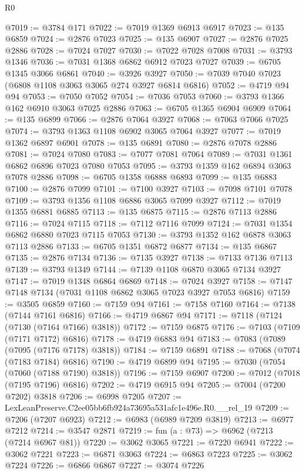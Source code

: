 \begin{lexlean}{R0}
\begin{coremodule}
@7019 := @3784 @171
@7022 := @7019 @1369 @6913 @6917
@7023 := @135 @6859
@7024 := @2876 @7023
@7025 := @135 @6907
@7027 := @2876 @7025 @2886
@7028 := @7024 @7027
@7030 := @7022 @7028 @7008
@7031 := @3793 @1346
@7036 := @7031 @1368 @6862 @6912 @7023 @7027
@7039 := @6705 @1345 @3066 @6861
@7040 := @3926 @3927
@7050 := @7039 @7040 @7023 (@6808 @1108 @3063 @3065 @274 @3927 @6814 @6816)
@7052 := @4719 @94 @94
@7053 := @7050 @7052
@7054 := @7036 @7053
@7060 := @3793 @1366 @162 @6910 @3063 @7025 @2886
@7063 := @6705 @1365 @6904 @6909
@7064 := @135 @6899
@7066 := @2876 @7064 @3927
@7068 := @7063 @7066 @7025
@7074 := @3793 @1363 @1108 @6902 @3065 @7064 @3927
@7077 := @7019 @1362 @6897 @6901
@7078 := @135 @6891
@7080 := @2876 @7078 @2886
@7081 := @7024 @7080
@7083 := @7077 @7081 @7064
@7089 := @7031 @1361 @6862 @6896 @7023 @7080 @7053
@7095 := @3793 @1359 @162 @6894 @3063 @7078 @2886
@7098 := @6705 @1358 @6888 @6893
@7099 := @135 @6883
@7100 := @2876 @7099
@7101 := @7100 @3927
@7103 := @7098 @7101 @7078
@7109 := @3793 @1356 @1108 @6886 @3065 @7099 @3927
@7112 := @7019 @1355 @6881 @6885
@7113 := @135 @6875
@7115 := @2876 @7113 @2886
@7116 := @7024 @7115
@7118 := @7112 @7116 @7099
@7124 := @7031 @1354 @6862 @6880 @7023 @7115 @7053
@7130 := @3793 @1352 @162 @6878 @3063 @7113 @2886
@7133 := @6705 @1351 @6872 @6877
@7134 := @135 @6867
@7135 := @2876 @7134
@7136 := @7135 @3927
@7138 := @7133 @7136 @7113
@7139 := @3793 @1349
@7144 := @7139 @1108 @6870 @3065 @7134 @3927
@7147 := @7019 @1348 @6864 @6869
@7148 := @7024 @3927
@7158 := @7147 @7148 @7134 (@7031 @1108 @6862 @3065 @7023 @3927 @7053 @6816)
@7159 := @3505 @6859
@7160 := @7159 @94
@7161 := @7158 @7160
@7164 := @7138 (@7144 @7161 @6816)
@7166 := @4719 @6867 @94
@7171 := @7118 (@7124 (@7130 (@7164 @7166) @3818))
@7172 := @7159 @6875
@7176 := @7103 (@7109 (@7171 @7172) @6816)
@7178 := @4719 @6883 @94
@7183 := @7083 (@7089 (@7095 (@7176 @7178) @3818))
@7184 := @7159 @6891
@7188 := @7068 (@7074 (@7183 @7184) @6816)
@7190 := @4719 @6899 @94
@7195 := @7030 (@7054 (@7060 (@7188 @7190) @3818))
@7196 := @7159 @6907
@7200 := @7012 (@7018 (@7195 @7196) @6816)
@7202 := @4719 @6915 @94
@7205 := @7004 (@7200 @7202) @3818
@7206 := @6998 @7205
@7207 := LexLeanPreserve.C2ee05bb6fb924a73695a531afc1e496e.R0.__rel_19
@7209 := @7206 (@7207 @6923)
@7212 := @6983 (@6989 @7209 @3819)
@7213 := @6977 @7212
@7214 := @3547 @2871
@7219 := fun (a : @73) => @6962 (@7213 (@7214 @6967 @81))
@7220 := @3062 @3065
@7221 := @7220 @6941
@7222 := @3062 @7221
@7223 := @6871 @3063
@7224 := @6863 @7223
@7225 := @3062 @7224
@7226 := @6866 @6867
@7227 := @3074 @7226

\end{coremodule}
\end{lexlean}
